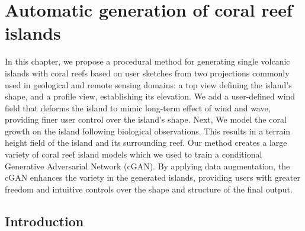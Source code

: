 \resetgraphicspath
{}

\chapter{Automatic generation of coral reef islands}
\label{chap:coral-island}

\abstract
In this chapter, we propose a procedural method for generating single volcanic islands with coral reefs based on user sketches from two projections commonly used in geological and remote sensing domains: a top view defining the island's shape, and a profile view, establishing its elevation. 
We add a user-defined wind field that deforms the island to mimic long-term effect of wind and wave, providing finer user control over the island's shape.
Next, We model the coral growth on the island following biological observations.
This results in a terrain height field of the island and its surrounding reef. 
Our method creates a large variety of coral reef island models which we used to train a conditional Generative Adversarial Network (cGAN). 
By applying data augmentation, the cGAN enhances the variety in the generated islands, providing users with greater freedom and intuitive controls over the shape and structure of the final output.
\pagebreak

\minitoc

\section{Introduction}
\label{sec:coral-island-introduction}

